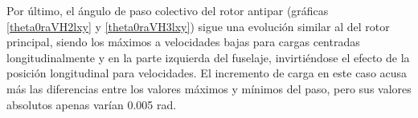 Por último, el ángulo de paso colectivo del rotor antipar (gráficas \ref{theta0raVH2lxy} y \ref{theta0raVH3lxy}) sigue una evolución similar al del rotor principal, siendo los máximos a velocidades bajas para cargas centradas longitudinalmente y en la parte izquierda del fuselaje, invirtiéndose el efecto de la posición longitudinal para velocidades. El incremento de carga en este caso acusa más las diferencias entre los valores máximos y mínimos del paso, pero sus valores absolutos apenas varían 0.005 rad.


\singlespacing
